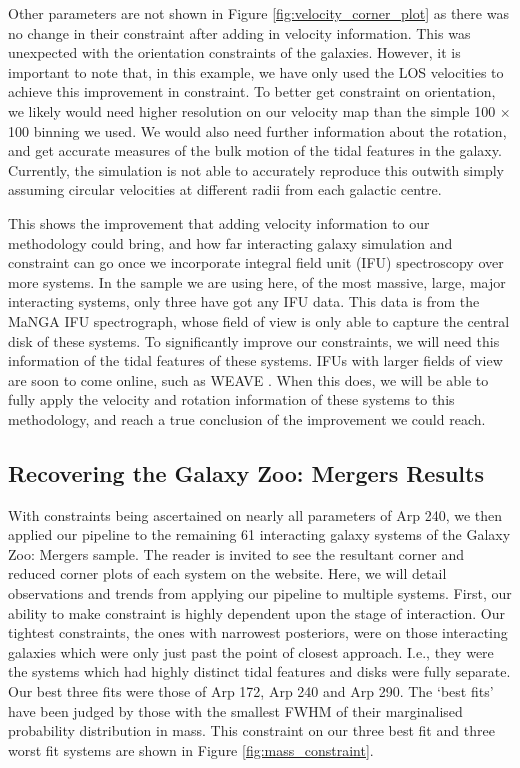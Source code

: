 Other parameters are not shown in Figure \ref{fig:velocity_corner_plot} as there was no change in their constraint after adding in velocity information. This was unexpected with the orientation constraints of the galaxies. However, it is important to note that, in this example, we have only used the LOS velocities to achieve this improvement in constraint. To better get constraint on orientation, we likely would need higher resolution on our velocity map than the simple 100 $\times$ 100 binning we used. We would also need further information about the rotation, and get accurate measures of the bulk motion of the tidal features in the galaxy. Currently, the simulation is not able to accurately reproduce this outwith simply assuming circular velocities at different radii from each galactic centre. 

This shows the improvement that adding velocity information to our methodology could bring, and how far interacting galaxy simulation and constraint can go once we incorporate integral field unit (IFU) spectroscopy over more systems. In the sample we are using here, of the most massive, large, major interacting systems, only three have got any IFU data. This data is from the MaNGA \citep{2015ApJ...798....7B} IFU spectrograph, whose field of view is only able to capture the central disk of these systems. To significantly improve our constraints, we will need this information of the tidal features of these systems. IFUs with larger fields of view are soon to come online, such as WEAVE \citep{2014SPIE.9147E..0LD}. When this does, we will be able to fully apply the velocity and rotation information of these systems to this methodology, and reach a true conclusion of the improvement we could reach.

\subsection{Recovering the Galaxy Zoo: Mergers Results}
\noindent With constraints being ascertained on nearly all parameters of Arp 240, we then applied our pipeline to the remaining 61 interacting galaxy systems of the Galaxy Zoo: Mergers sample. The reader is invited to see the resultant corner and reduced corner plots of each system on the website. Here, we will detail observations and trends from applying our pipeline to multiple systems. First, our ability to make constraint is highly dependent upon the stage of interaction. Our tightest constraints, the ones with narrowest posteriors, were on those interacting galaxies which were only just past the point of closest approach. I.e., they were the systems which had highly distinct tidal features and disks were fully separate. Our best three fits were those of Arp 172, Arp 240 and Arp 290. The `best fits' have been judged by those with the smallest FWHM of their marginalised probability distribution in mass. This constraint on our three best fit and three worst fit systems are shown in Figure \ref{fig:mass_constraint}.

